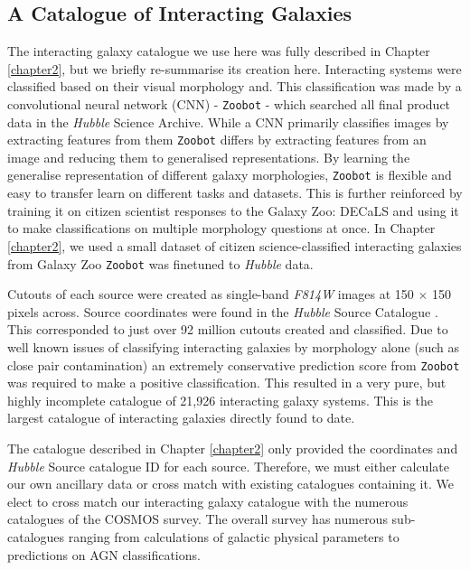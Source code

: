 \subsection{A Catalogue of Interacting Galaxies}
\noindent The interacting galaxy catalogue we use here was fully described in Chapter \ref{chapter2}, but we briefly re-summarise its creation here. Interacting systems were classified based on their visual morphology and. This classification was made by a convolutional neural network (CNN) - \texttt{Zoobot} - which searched all final product data in the \emph{Hubble} Science Archive. While a CNN primarily classifies images by extracting features from them \texttt{Zoobot} differs by extracting features from an image and reducing them to generalised representations. By learning the generalise representation of different galaxy morphologies, \texttt{Zoobot} is flexible and easy to transfer learn on different tasks and datasets. This is further reinforced by training it on citizen scientist responses to the Galaxy Zoo: DECaLS \citep{2022MNRAS.509.3966W} and using it to make classifications on multiple morphology questions at once. In Chapter \ref{chapter2}, we used a small dataset of citizen science-classified interacting galaxies from Galaxy Zoo \citep{2008MNRAS.389.1179L} \texttt{Zoobot} was finetuned to \emph{Hubble} data.

Cutouts of each source were created as single-band \textit{F814W} images at 150 $\times$ 150 pixels across. Source coordinates were found in the \emph{Hubble} Source Catalogue \citep{2016AJ....151..134W}. This corresponded to just over 92 million cutouts created and classified. Due to well known issues of classifying interacting galaxies by morphology alone (such as close pair contamination) an extremely conservative prediction score from \texttt{Zoobot} was required to make a positive classification. This resulted in a very pure, but highly incomplete catalogue of 21,926 interacting galaxy systems. This is the largest catalogue of interacting galaxies directly found to date.

The catalogue described in Chapter \ref{chapter2} only provided the coordinates and \emph{Hubble} Source catalogue ID for each source. Therefore, we must either calculate our own ancillary data or cross match with existing catalogues containing it. We elect to cross match our interacting galaxy catalogue with the numerous catalogues of the COSMOS survey. The overall survey has numerous sub-catalogues ranging from calculations of galactic physical parameters to predictions on AGN classifications. 

